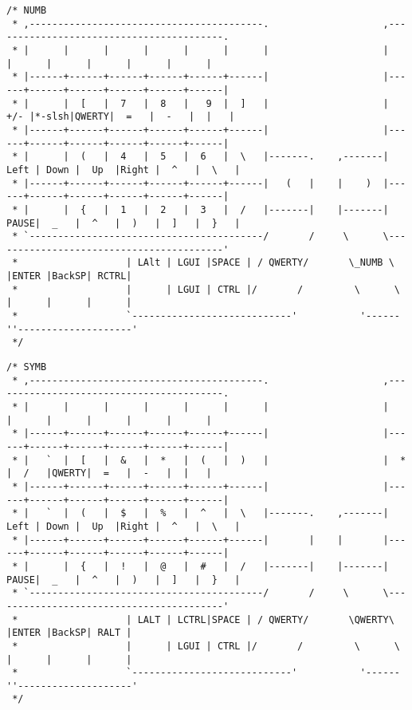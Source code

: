 \documentclass[12pt]{report}
\begin{document}
\begin{verbatim}
/* NUMB
 * ,-----------------------------------------.                    ,-----------------------------------------.
 * |      |      |      |      |      |      |                    |      |      |      |      |      |      |
 * |------+------+------+------+------+------|                    |------+------+------+------+------+------|
 * |      |  [   |  7   |  8   |   9  |  ]   |                    |  +/- |*-slsh|QWERTY|  =   |  -   |  |   |
 * |------+------+------+------+------+------|                    |------+------+------+------+------+------|
 * |      |  (   |  4   |  5   |  6   |  \   |-------.    ,-------| Left | Down |  Up  |Right |  ^   |  \   |
 * |------+------+------+------+------+------|   (   |    |    )  |------+------+------+------+------+------|
 * |      |  {   |  1   |  2   |  3   |  /   |-------|    |-------| PAUSE|  _   |  ^   |  )   |  ]   |  }   |
 * `-----------------------------------------/       /     \      \-----------------------------------------'
 *                   | LAlt | LGUI |SPACE | / QWERTY/       \_NUMB \  |ENTER |BackSP| RCTRL|
 *                   |      | LGUI | CTRL |/       /         \      \ |      |      |      |
 *                   `----------------------------'           '------''--------------------'
 */
\end{verbatim}
\begin{verbatim}
/* SYMB
 * ,-----------------------------------------.                    ,-----------------------------------------.
 * |      |      |      |      |      |      |                    |      |      |      |      |      |      |
 * |------+------+------+------+------+------|                    |------+------+------+------+------+------|
 * |   `  |  [   |  &   |  *   |  (   |  )   |                    |  *   |  /   |QWERTY|  =   |  -   |  |   |
 * |------+------+------+------+------+------|                    |------+------+------+------+------+------|
 * |   `  |  (   |  $   |  %   |  ^   |  \   |-------.    ,-------| Left | Down |  Up  |Right |  ^   |  \   |
 * |------+------+------+------+------+------|       |    |       |------+------+------+------+------+------|
 * |      |  {   |  !   |  @   |  #   |  /   |-------|    |-------| PAUSE|  _   |  ^   |  )   |  ]   |  }   |
 * `-----------------------------------------/       /     \      \-----------------------------------------'
 *                   | LALT | LCTRL|SPACE | / QWERTY/       \QWERTY\  |ENTER |BackSP| RALT |
 *                   |      | LGUI | CTRL |/       /         \      \ |      |      |      |
 *                   `----------------------------'           '------''--------------------'
 */
\end{verbatim}
\end{document}
